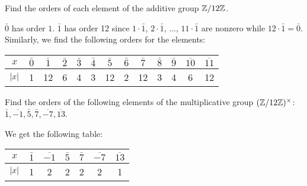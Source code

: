  Find the orders of each element of the additive group
$\mathbb{Z}/12\mathbb{Z}$.
\begin{solution}
  $\bar0$ has order $1$. $\bar1$ has order 12 since $1\cdot\bar1$,
  $2\cdot\bar1$, $\ldots$, $11\cdot\bar1$ are nonzero while
  $12\cdot\bar1 = \bar0$. Similarly, we find the following orders for
  the elements:

  \begin{center}
    \begin{tabular}{c|c|c|c|c|c|c|c|c|c|c|c|c}
      $x$ & $\bar0$ & $\bar1$ & $\bar2$ & $\bar3$ & $\bar4$ & $\bar5$ & $\bar6$
      & $\bar7$ & $\bar8$ & $\bar9$ & $\overline{10}$ & $\overline{11}$ \\\hline
      $\lvert{x}\rvert$ & 1 & 12 & 6 & 4 & 3 & 12 & 2 & 12 & 3 & 4 & 6 & 12
    \end{tabular}
  \end{center}
\end{solution}

 Find the orders of the following elements of the
multiplicative group $(\mathbb{Z}/12\mathbb{Z})^\times$:
$\bar1, \overline{-1}, \bar5, \bar7, \overline{-7}, \overline{13}$.
\begin{solution}
  We get the following table:
  \begin{center}
    \begin{tabular}{c|c|c|c|c|c|c}
      $x$ & $\bar1$ & $\overline{-1}$ & $\bar5$ & $\bar7$ & $\overline{-7}$
      & $\overline{13}$ \\\hline
      $\lvert{x}\rvert$ & 1 & 2 & 2 & 2 & 2 & 1
    \end{tabular}
  \end{center}
\end{solution}
